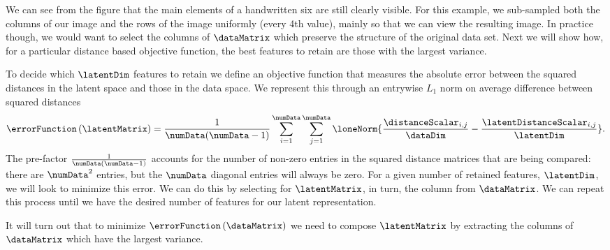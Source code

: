 We can see from the figure that the main elements of a handwritten six
are still clearly visible. For this example, we sub-sampled both the
columns of our image and the rows of the image uniformly (every 4th
value), mainly so that we can view the resulting image. In practice
though, we would want to select the columns of $\dataMatrix$ which
preserve the structure of the original data set. Next we will show
how, for a particular distance based objective function, the best
features to retain are those with the largest variance.

To decide which $\latentDim$ features to retain we define an objective
function that measures the absolute error between the squared
distances in the latent space and those in the data space. We
represent this through an entrywise $L_{1}$ norm on average difference
between squared distances
\[
\errorFunction\left(\latentMatrix\right)=\frac{1}{\numData(\numData-1)}\sum_{i=1}^{\numData}\sum_{j=1}^{\numData}\loneNorm{\frac{\distanceScalar_{i,j}}{\dataDim}-\frac{\latentDistanceScalar_{i,j}}{\latentDim}}.
\]
The pre-factor $\frac{1}{\numData(\numData-1)}$ accounts for the
number of non-zero entries in the squared distance matrices that are
being compared: there are $\numData^2$ entries, but the $\numData$
diagonal entries will always be zero.  For a given number of retained
features, $\latentDim$, we will look to minimize this error. We can do
this by selecting for $\latentMatrix$, in turn, the column from
$\dataMatrix$. We can repeat this process until we have the desired
number of features for our latent representation.

It will turn out that to minimize $\errorFunction\left(\dataMatrix\right)$
we need to compose $\latentMatrix$ by extracting the columns of
$\dataMatrix$ which have the largest variance.


